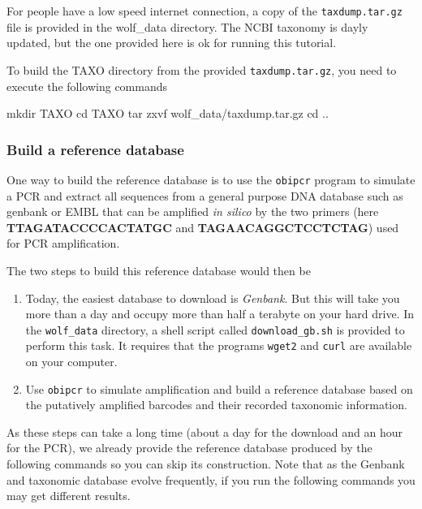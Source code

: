 \documentclass[
  letterpaper,
  DIV=11,
  numbers=noendperiod]{scrreprt}
\newenvironment{Shaded}{\begin{snugshade}}{\end{snugshade}}
\newcommand{\BuiltInTok}[1]{\textcolor[rgb]{0.00,0.23,0.31}{#1}}
\newcommand{\FunctionTok}[1]{\textcolor[rgb]{0.28,0.35,0.67}{#1}}
\newcommand{\NormalTok}[1]{\textcolor[rgb]{0.00,0.23,0.31}{#1}}
\begin{document}
For people have a low speed internet connection, a copy of the
\texttt{taxdump.tar.gz} file is provided in the wolf\_data directory.
The NCBI taxonomy is dayly updated, but the one provided here is ok for
running this tutorial.

To build the TAXO directory from the provided \texttt{taxdump.tar.gz},
you need to execute the following commands

\begin{Shaded}
\begin{Highlighting}[]
\FunctionTok{mkdir}\NormalTok{ TAXO}
\BuiltInTok{cd}\NormalTok{ TAXO}
\FunctionTok{tar}\NormalTok{ zxvf wolf\_data/taxdump.tar.gz }
\BuiltInTok{cd}\NormalTok{ ..}
\end{Highlighting}
\end{Shaded}

\hypertarget{build-a-reference-database}{%
\subsubsection*{Build a reference
database}\label{build-a-reference-database}}

One way to build the reference database is to use the \texttt{obipcr}
program to simulate a PCR and extract all sequences from a general
purpose DNA database such as genbank or EMBL that can be amplified
\emph{in silico} by the two primers (here \textbf{TTAGATACCCCACTATGC}
and \textbf{TAGAACAGGCTCCTCTAG}) used for PCR amplification.

The two steps to build this reference database would then be

\begin{enumerate}
\def\labelenumi{\arabic{enumi}.}
\item
  Today, the easiest database to download is \emph{Genbank}. But this
  will take you more than a day and occupy more than half a terabyte on
  your hard drive. In the \texttt{wolf\_data} directory, a shell script
  called \texttt{download\_gb.sh} is provided to perform this task. It
  requires that the programs \texttt{wget2} and \texttt{curl} are
  available on your computer.
\item
  Use \texttt{obipcr} to simulate amplification and build a reference
  database based on the putatively amplified barcodes and their recorded
  taxonomic information.
\end{enumerate}

As these steps can take a long time (about a day for the download and an
hour for the PCR), we already provide the reference database produced by
the following commands so you can skip its construction. Note that as
the Genbank and taxonomic database evolve frequently, if you run the
following commands you may get different results.
\end{document}
